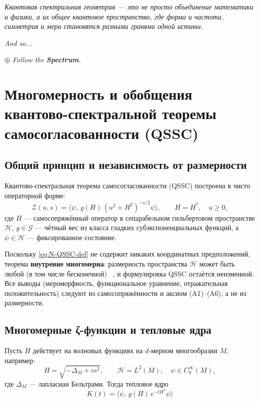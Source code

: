 \documentclass{article}
\numberwithin{equation}{section}
\theoremstyle{plain}
\theoremstyle{definition}
\theoremstyle{remark}
\def\infty{∞}\def\partial{∂}\def\sum{Σ}\def\int{∫}%
\begin{document}
\begin{center}
\textit{Квантовая спектральная геометрия — это не просто объединение математики и физики,  
а их общее квантовое пространство, где форма и частота, симметрия и мера  
становятся разными гранями одной истины.}
\end{center}

\noindent
\textit{And so...}

\noindent
\textit{$\oplus$ Follow the \textbf{Spectrum}.}


\clearpage

\section{Многомерность и обобщения квантово-спектральной теоремы самосогласованности (QSSC)}

\subsection*{Общий принцип и независимость от размерности}

Квантово-спектральная теорема самосогласованности (QSSC) построена в чисто операторной форме:
\begin{equation}\label{eq:N-QSSC-def}
\mathcal Z(u,s)
=\big\langle \psi,\ g(H)\,(u^2+H^2)^{-s/2}\psi\big\rangle,
\qquad H=H^\ast,\quad u\ge0,
\end{equation}
где \(H\) — самосопряжённый оператор в сепарабельном гильбертовом пространстве \(\mathcal H\),  
\(g\in\mathcal G\) — чётный вес из класса гладких субэкспоненциальных функций,  
а \(\psi\in\mathcal H\) — фиксированное состояние.  

Поскольку \eqref{eq:N-QSSC-def} не содержит никаких координатных предположений,  
теорема \textbf{внутренне многомерна}: размерность пространства \(\mathcal H\) может быть любой (в том числе бесконечной) ~\cite{ReedSimonI, DunfordSchwartz},  
и формулировка QSSC остаётся неизменной.  
Все выводы (мероморфность, функциональное уравнение, отражательная положительность)  
следуют из самосопряжённости и аксиом (A1)–(A6), а не из размерности.

\subsection*{Многомерные ζ-функции и тепловые ядра}

Пусть \(H\) действует на волновых функциях на \(d\)-мерном многообразии \(M\), например:
\begin{equation}
H=\sqrt{-\Delta_M+m^2},
\qquad \mathcal H=L^2(M),\quad \psi\in C_0^\infty(M),
\label{eq:QSSC0061}
\end{equation}
где \(\Delta_M\) — лапласиан Бельтрами. Тогда тепловое ядро
\begin{equation}
K(t)=\langle\psi,\,g(H)\,e^{-tH^2}\psi\rangle
\label{eq:QSSC0062}
\end{equation}
\end{document}
